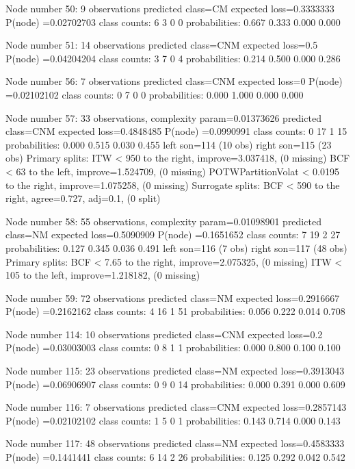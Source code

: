 \documentclass{article}
\begin{document}
\begin{Schunk}
\begin{Soutput}
Node number 50: 9 observations
  predicted class=CM   expected loss=0.3333333  P(node) =0.02702703
    class counts:     6     3     0     0
   probabilities: 0.667 0.333 0.000 0.000 

Node number 51: 14 observations
  predicted class=CNM  expected loss=0.5  P(node) =0.04204204
    class counts:     3     7     0     4
   probabilities: 0.214 0.500 0.000 0.286 

Node number 56: 7 observations
  predicted class=CNM  expected loss=0  P(node) =0.02102102
    class counts:     0     7     0     0
   probabilities: 0.000 1.000 0.000 0.000 

Node number 57: 33 observations,    complexity param=0.01373626
  predicted class=CNM  expected loss=0.4848485  P(node) =0.0990991
    class counts:     0    17     1    15
   probabilities: 0.000 0.515 0.030 0.455 
  left son=114 (10 obs) right son=115 (23 obs)
  Primary splits:
      ITW                < 950    to the right, improve=3.037418, (0 missing)
      BCF                < 63     to the left,  improve=1.524709, (0 missing)
      POTWPartitionVolat < 0.0195 to the right, improve=1.075258, (0 missing)
  Surrogate splits:
      BCF < 590    to the right, agree=0.727, adj=0.1, (0 split)

Node number 58: 55 observations,    complexity param=0.01098901
  predicted class=NM   expected loss=0.5090909  P(node) =0.1651652
    class counts:     7    19     2    27
   probabilities: 0.127 0.345 0.036 0.491 
  left son=116 (7 obs) right son=117 (48 obs)
  Primary splits:
      BCF < 7.65   to the right, improve=2.075325, (0 missing)
      ITW < 105    to the left,  improve=1.218182, (0 missing)

Node number 59: 72 observations
  predicted class=NM   expected loss=0.2916667  P(node) =0.2162162
    class counts:     4    16     1    51
   probabilities: 0.056 0.222 0.014 0.708 

Node number 114: 10 observations
  predicted class=CNM  expected loss=0.2  P(node) =0.03003003
    class counts:     0     8     1     1
   probabilities: 0.000 0.800 0.100 0.100 

Node number 115: 23 observations
  predicted class=NM   expected loss=0.3913043  P(node) =0.06906907
    class counts:     0     9     0    14
   probabilities: 0.000 0.391 0.000 0.609 

Node number 116: 7 observations
  predicted class=CNM  expected loss=0.2857143  P(node) =0.02102102
    class counts:     1     5     0     1
   probabilities: 0.143 0.714 0.000 0.143 

Node number 117: 48 observations
  predicted class=NM   expected loss=0.4583333  P(node) =0.1441441
    class counts:     6    14     2    26
   probabilities: 0.125 0.292 0.042 0.542 
\end{Soutput}
\end{Schunk}
\end{document}
